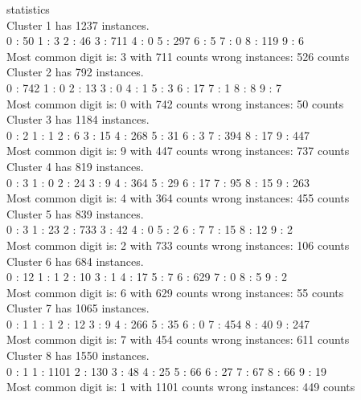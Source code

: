\documentclass[paper=a4, fontsize=11pt]{scrartcl} %
\numberwithin{equation}{section} %
\numberwithin{figure}{section} %
\numberwithin{table}{section} %
\begin{document}
\begin{itemize}
statistics\\
Cluster 1 has 1237 instances.\\
0 : 50  1 : 3   2 : 46  3 : 711 4 : 0   5 : 297 6 : 5   7 : 0   8 : 119 9 : 6\\
Most common digit is: 3 with 711 counts wrong instances: 526 counts\\

Cluster 2 has 792 instances.\\
0 : 742 1 : 0   2 : 13  3 : 0   4 : 1   5 : 3   6 : 17  7 : 1   8 : 8   9 : 7\\
Most common digit is: 0 with 742 counts wrong instances: 50 counts\\

Cluster 3 has 1184 instances.\\
0 : 2   1 : 1   2 : 6   3 : 15  4 : 268 5 : 31  6 : 3   7 : 394 8 : 17  9 : 447\\
Most common digit is: 9 with 447 counts wrong instances: 737 counts\\

Cluster 4 has 819 instances.\\
0 : 3   1 : 0   2 : 24  3 : 9   4 : 364 5 : 29  6 : 17  7 : 95  8 : 15  9 : 263\\
Most common digit is: 4 with 364 counts wrong instances: 455 counts\\

Cluster 5 has 839 instances.\\
0 : 3   1 : 23  2 : 733 3 : 42  4 : 0   5 : 2   6 : 7   7 : 15  8 : 12  9 : 2\\
Most common digit is: 2 with 733 counts wrong instances: 106 counts\\

Cluster 6 has 684 instances.\\
0 : 12  1 : 1   2 : 10  3 : 1   4 : 17  5 : 7   6 : 629 7 : 0   8 : 5   9 : 2\\
Most common digit is: 6 with 629 counts wrong instances: 55 counts\\

Cluster 7 has 1065 instances.\\
0 : 1   1 : 1   2 : 12  3 : 9   4 : 266 5 : 35  6 : 0   7 : 454 8 : 40  9 : 247\\
Most common digit is: 7 with 454 counts wrong instances: 611 counts\\

Cluster 8 has 1550 instances.\\
0 : 1   1 : 1101        2 : 130 3 : 48  4 : 25  5 : 66  6 : 27  7 : 67  8 : 66  9 : 19\\
Most common digit is: 1 with 1101 counts        wrong instances: 449 counts\\


\end{itemize}
\end{document}
